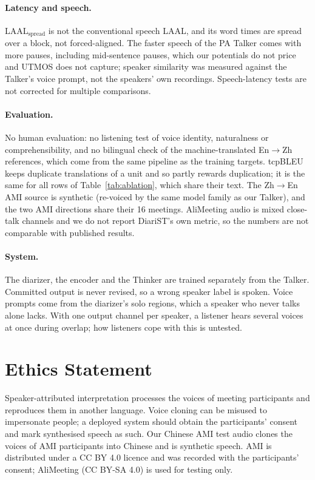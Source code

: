 \paragraph{Latency and speech.} LAAL$_\text{spread}$ is not the conventional speech LAAL, and its word times are spread
over a block, not forced-aligned. The faster speech of the PA Talker comes with more pauses, including mid-sentence
pauses, which our potentials do not price and UTMOS does not capture; speaker similarity was measured against the
Talker's voice prompt, not the speakers' own recordings. Speech-latency tests are not corrected for multiple
comparisons.

\paragraph{Evaluation.} No human evaluation: no listening test of voice identity, naturalness or comprehensibility,
and no bilingual check of the machine-translated En$\rightarrow$Zh references, which come from the same pipeline as the
training targets. tcpBLEU keeps duplicate translations of a unit and so partly rewards duplication; it is the same for
all rows of Table~\ref{tab:ablation}, which share their text. The Zh$\rightarrow$En AMI source is synthetic (re-voiced by
the same model family as our Talker), and the two AMI directions share their 16 meetings. AliMeeting audio is mixed
close-talk channels and we do not report DiariST's own metric, so the numbers are not comparable with published
results.

\paragraph{System.} The diarizer, the encoder and the Thinker are trained separately from the Talker. Committed output
is never revised, so a wrong speaker label is spoken. Voice prompts come from the diarizer's solo regions, which a
speaker who never talks alone lacks. With one output channel per speaker, a listener hears several voices at once
during overlap; how listeners cope with this is untested.

\section*{Ethics Statement}

Speaker-attributed interpretation processes the voices of meeting participants and reproduces them in another
language. Voice cloning can be misused to impersonate people; a deployed system should obtain the participants'
consent and mark synthesised speech as such. Our Chinese AMI test audio clones the voices of AMI participants into
Chinese and is synthetic speech. AMI is distributed under a CC BY 4.0 licence and was recorded with the participants'
consent; AliMeeting (CC BY-SA 4.0) is used for testing only.
